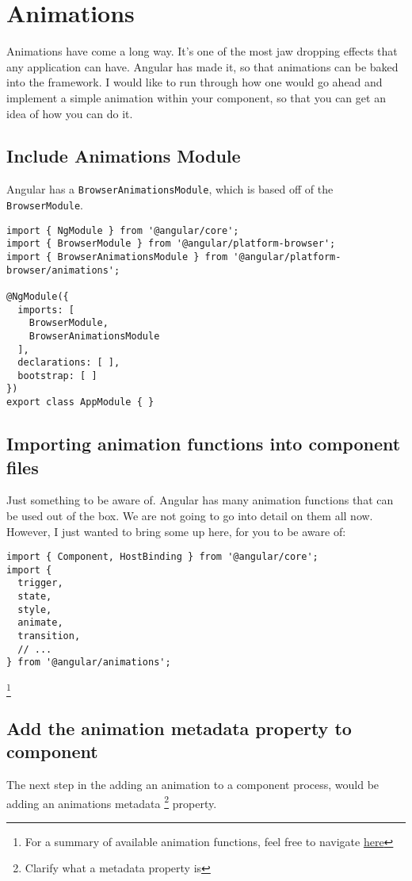 
\section{ Animations }

Animations have come a long way. It's one of the most jaw dropping effects
that any application can have. Angular has made it, so that animations can be
baked into the framework. I would like to run through how one would go ahead
and implement a simple animation within your component, so that you can get an 
idea of how you can do it. 

\subsection{ Include Animations Module }
Angular has a \lstinline{BrowserAnimationsModule}, which is based off of the 
\lstinline{BrowserModule}.

\begin{lstlisting}[caption=app.module.ts]
import { NgModule } from '@angular/core';
import { BrowserModule } from '@angular/platform-browser';
import { BrowserAnimationsModule } from '@angular/platform-browser/animations';

@NgModule({
  imports: [
    BrowserModule,
    BrowserAnimationsModule
  ],
  declarations: [ ],
  bootstrap: [ ]
})
export class AppModule { }  
\end{lstlisting}

\subsection{ Importing animation functions into component files }
Just something to be aware of. Angular has many animation functions that can
be used out of the box. We are not going to go into detail on them all now. 
However, I just wanted to bring some up here, for you to be aware of: 
\begin{lstlisting}[caption=app.component.ts]
import { Component, HostBinding } from '@angular/core';
import {
  trigger,
  state,
  style,
  animate,
  transition,
  // ...
} from '@angular/animations';  
\end{lstlisting}

\footnote{For a summary of available animation functions, feel free to navigate 
\href{https://angular.io/guide/animations\#animation-api-summary}{here}}

\subsection{Add the animation metadata property to component}
The next step in the adding an animation to a component process, would be 
adding an animations metadata \footnote{Clarify what a metadata property is}
property.

